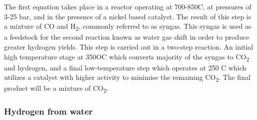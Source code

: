 The first equation takes place in a reactor operating at 700-850\textdegree C, at pressures of 3-25 bar, and in the presence of a nickel based catalyst. The result of this step is a mixture of CO and H\textsubscript{2}, commonly referred to as syngas. This syngas is used as a feedstock for the second reaction known as water gas shift in order to produce greater hydrogen yields.  This step is carried out in a two-step reaction. An initial high temperature stage at 350OC which converts majority of the syngas to CO\textsubscript{2} and hydrogen, and a final low-temperature step which operates at 250 C which utilizes a catalyst with higher activity to minimise the remaining CO\textsubscript{2}. The final product will be a mixture of CO\textsubscript{2}.  


\subsubsection{Hydrogen from water}

\renewcommand{\bibname}{References}

